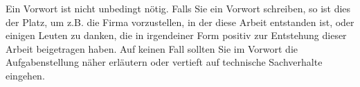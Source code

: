 \preface

Ein Vorwort ist nicht unbedingt nötig. Falls Sie ein Vorwort schreiben, so ist dies der Platz, um z.B. die Firma vorzustellen, in der diese Arbeit entstanden ist, oder einigen Leuten zu danken, die in irgendeiner Form positiv zur Entstehung dieser Arbeit beigetragen haben. Auf keinen Fall sollten Sie im Vorwort die Aufgabenstellung näher erläutern oder vertieft auf technische Sachverhalte eingehen.